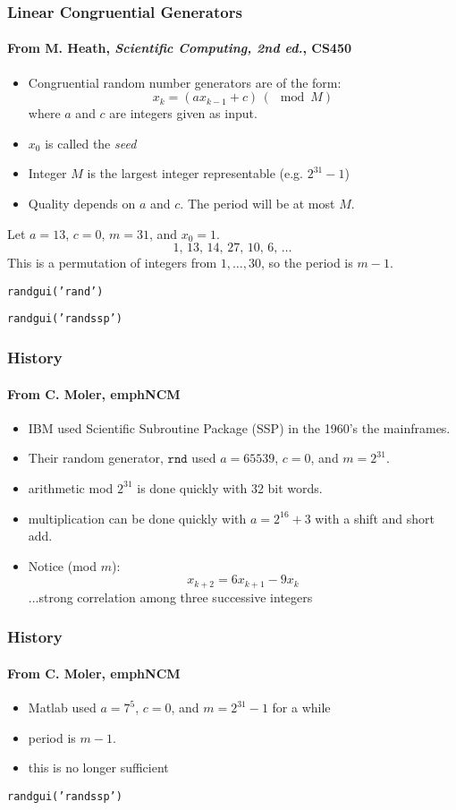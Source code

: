 \documentclass[10pt]{beamer}
\begin{document}
\begin{frame}
\frametitle{Linear Congruential Generators}
\framesubtitle{From M. Heath, \emph{Scientific Computing, 2nd ed.}, CS450}
\begin{itemize}
    \item Congruential random number generators are of the form:
\[
x_k = (a x_{k-1} + c)\, (\mod M)
\]
where $a$ and $c$ are integers given as input.
    \item $x_0$ is called the \emph{seed}
    \item Integer $M$ is the largest integer representable (e.g. $2^{31} -1$)
    \item Quality depends on $a$ and $c$.  The period will be at most $M$.
\end{itemize}
\begin{example}
Let $a=13$, $c=0$, $m=31$, and $x_0=1$.
\[
1,\, 13,\, 14,\, 27,\, 10,\, 6,\, \dots
\]
This is a permutation of integers from $1,\dots,30$, so the period is $m-1$.
\end{example}
\bigskip

\texttt{randgui('rand')}

\texttt{randgui('randssp')}
\end{frame}
\begin{frame}
\frametitle{History} 
\framesubtitle{From C. Moler, emph{NCM}}
\begin{itemize}
    \item IBM used Scientific Subroutine Package (SSP) in the 1960's the
mainframes.
    \item Their random generator, $\texttt{rnd}$ used $a=65539$, $c=0$, and
$m=2^{31}$.
    \item arithmetic mod $2^{31}$ is done quickly with 32 bit words.
    \item multiplication can be done quickly with $a=2^{16}+3$ with a shift and
short add.
    \item Notice (mod $m$):
\[
    x_{k+2} = 6x_{k+1} - 9 x_{k}
\]
...strong correlation among three successive integers
\end{itemize}
\end{frame}
\begin{frame}
\frametitle{History} 
\framesubtitle{From C. Moler, emph{NCM}}
\begin{itemize}
    \item Matlab used $a = 7^5$, $c=0$, and $m=2^{31}-1$ for a while
    \item period is $m-1$.
    \item this is no longer sufficient
\end{itemize}
\bigskip

\texttt{randgui('randssp')}
\end{frame}
\end{document}
